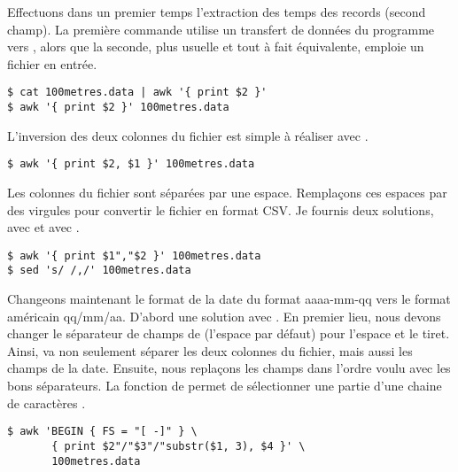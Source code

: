 Effectuons dans un premier temps l'extraction des temps des records
(second champ). La première commande utilise un transfert de données
du programme  vers , alors que la seconde, plus
usuelle et tout à fait équivalente, emploie un fichier en entrée.
\begin{Schunk}
\begin{Verbatim}
$ cat 100metres.data | awk '{ print $2 }'
$ awk '{ print $2 }' 100metres.data
\end{Verbatim}
\end{Schunk}

L'inversion des deux colonnes du fichier est simple à réaliser avec
.
\begin{Schunk}
\begin{Verbatim}
$ awk '{ print $2, $1 }' 100metres.data
\end{Verbatim}
\end{Schunk}

Les colonnes du fichier  sont séparées par une
espace. Remplaçons ces espaces par des virgules pour convertir le
fichier en format CSV. Je fournis deux solutions, avec  et avec
.
\begin{Schunk}
\begin{Verbatim}
$ awk '{ print $1","$2 }' 100metres.data
$ sed 's/ /,/' 100metres.data
\end{Verbatim}
\end{Schunk}

Changeons maintenant le format de la date du format
 aaaa-mm-qq
vers le format américain qq/mm/aa. D'abord une solution avec
. En premier lieu, nous devons changer le séparateur de
champs de  (l'espace par défaut) pour l'espace et le tiret.
Ainsi,  va non seulement séparer les deux colonnes du
fichier, mais aussi les champs de la date. Ensuite, nous replaçons les
champs dans l'ordre voulu avec les bons séparateurs. La fonction
 de  permet
de sélectionner une partie d'une chaine de caractères
\citep[section~9.1.3]{awk}.
\begin{Schunk}
\begin{Verbatim}
$ awk 'BEGIN { FS = "[ -]" } \
       { print $2"/"$3"/"substr($1, 3), $4 }' \
       100metres.data
\end{Verbatim}
\end{Schunk}

